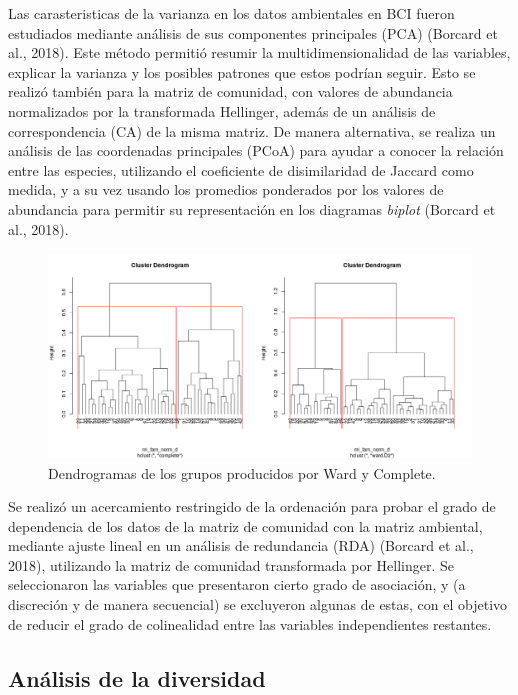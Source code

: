 \documentclass[11pt,]{article}
\begin{document}
Las carasteristicas de la varianza en los datos ambientales en BCI
fueron estudiados mediante análisis de sus componentes principales (PCA)
(Borcard et al., 2018). Este método permitió resumir la
multidimensionalidad de las variables, explicar la varianza y los
posibles patrones que estos podrían seguir. Esto se realizó también para
la matriz de comunidad, con valores de abundancia normalizados por la
transformada Hellinger, además de un análisis de correspondencia (CA) de
la misma matriz. De manera alternativa, se realiza un análisis de las
coordenadas principales (PCoA) para ayudar a conocer la relación entre
las especies, utilizando el coeficiente de disimilaridad de Jaccard como
medida, y a su vez usando los promedios ponderados por los valores de
abundancia para permitir su representación en los diagramas
\emph{biplot} (Borcard et al., 2018).

\begin{figure}
\centering
\includegraphics{grupos_ward_complete_altura_corte2.png}
\caption{Dendrogramas de los grupos producidos por Ward y Complete.
\label{fig:grupos_ward_complete_altura_corte2}}
\end{figure}

Se realizó un acercamiento restringido de la ordenación para probar el
grado de dependencia de los datos de la matriz de comunidad con la
matriz ambiental, mediante ajuste lineal en un análisis de redundancia
(RDA) (Borcard et al., 2018), utilizando la matriz de comunidad
transformada por Hellinger. Se seleccionaron las variables que
presentaron cierto grado de asociación, y (a discreción y de manera
secuencial) se excluyeron algunas de estas, con el objetivo de reducir
el grado de colinealidad entre las variables independientes restantes.

\subsection{Análisis de la
diversidad}\label{anuxe1lisis-de-la-diversidad}
\end{document}
